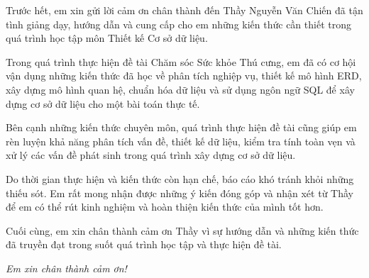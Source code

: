 Trước hết, em xin gửi lời cảm ơn chân thành đến Thầy Nguyễn Văn Chiến đã tận tình giảng dạy, hướng dẫn và cung cấp cho em những kiến thức cần thiết trong quá trình học tập môn Thiết kế Cơ sở dữ liệu.

Trong quá trình thực hiện đề tài Chăm sóc Sức khỏe Thú cưng, em đã có cơ hội vận dụng những kiến thức đã học về phân tích nghiệp vụ, thiết kế mô hình ERD, xây dựng mô hình quan hệ, chuẩn hóa dữ liệu và sử dụng ngôn ngữ SQL để xây dựng cơ sở dữ liệu cho một bài toán thực tế.

Bên cạnh những kiến thức chuyên môn, quá trình thực hiện đề tài cũng giúp em rèn luyện khả năng phân tích vấn đề, thiết kế dữ liệu, kiểm tra tính toàn vẹn và xử lý các vấn đề phát sinh trong quá trình xây dựng cơ sở dữ liệu.

Do thời gian thực hiện và kiến thức còn hạn chế, báo cáo khó tránh khỏi những thiếu sót. Em rất mong nhận được những ý kiến đóng góp và nhận xét từ Thầy để em có thể rút kinh nghiệm và hoàn thiện kiến thức của mình tốt hơn.

Cuối cùng, em xin chân thành cảm ơn Thầy vì sự hướng dẫn và những kiến thức đã truyền đạt trong suốt quá trình học tập và thực hiện đề tài.

\begin{flushright}
\textit{Em xin chân thành cảm ơn!}
\end{flushright}
